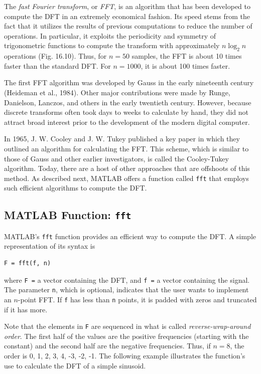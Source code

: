 \documentclass[../main.tex]{subfiles}
\begin{document}
The \textit{fast Fourier transform}, or \textit{FFT}, is an algorithm that has been developed to compute the DFT in an extremely economical fashion. Its speed stems from the fact that it
utilizes the results of previous computations to reduce the number of operations. In particular, it exploits the periodicity and symmetry of trigonometric functions to compute
the transform with approximately $n \log_2n$ operations (Fig. 16.10). Thus, for $n = 50$ samples, the FFT is about 10 times faster than the standard DFT. For $n = 1000$, it is about
100 times faster.

The first FFT algorithm was developed by Gauss in the early nineteenth century
(Heideman et al., 1984). Other major contributions were made by Runge, Danielson,
Lanczos, and others in the early twentieth century. However, because discrete transforms
often took days to weeks to calculate by hand, they did not attract broad interest prior to the
development of the modern digital computer.

In 1965, J. W. Cooley and J. W. Tukey published a key paper in which they outlined an
algorithm for calculating the FFT. This scheme, which is similar to those of Gauss and
other earlier investigators, is called the Cooley-Tukey algorithm. Today, there are a host of
other approaches that are offshoots of this method. As described next, MATLAB offers a
function called \texttt{fft} that employs such efficient algorithms to compute the DFT.

\label{cha:cha_P_16_5_2} %
\subsection{MATLAB Function: \texttt{fft}}

\noindent MATLAB's \texttt{fft} function provides an efficient way to compute the DFT. A simple representation of its syntax is

\begin{lstlisting}[numbers=none]
	F = fft(f, n)
\end{lstlisting}

where \texttt{F =} a vector containing the DFT, and \texttt{f =} a vector containing the signal. The
parameter \texttt{n}, which is optional, indicates that the user wants to implement an $n$-point FFT.
If \texttt{f} has less than \texttt{n} points, it is padded with zeros and truncated if it has more.

Note that the elements in \texttt{F} are sequenced in what is called \textit{reverse-wrap-around
order}. The first half of the values are the positive frequencies (starting with the constant)
and the second half are the negative frequencies. Thus, if $n = 8$, the order is 0, 1, 2, 3, 4, -3, -2, -1. The following example illustrates the function's use to calculate the DFT of a
simple sinusoid.
\end{document}
